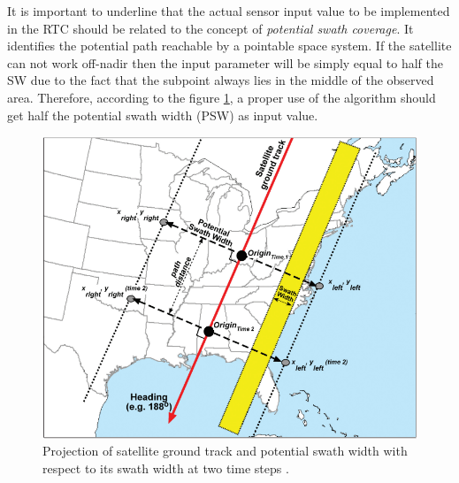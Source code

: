 It is important to underline that the actual sensor input value to be implemented in the RTC should be related to the concept of \textit{potential swath coverage}.
It identifies the potential path reachable by a pointable space system.
If the satellite can not work off-nadir then the input parameter will be simply equal to half the SW due to the fact that the subpoint always lies in the middle of the observed area.
Therefore, according to the figure \ref{potential_sw_fig}, a proper use of the algorithm should get half the potential swath width (PSW) as input value.
\begin{figure}[H]
      \centering
      \includegraphics[scale=0.6]{img/potential_sw.png}
      \caption{Projection of satellite ground track and potential swath width with respect to its swath width at two time steps \cite{hodgson2008modeling}.}
      \label{potential_sw_fig}
\end{figure}


